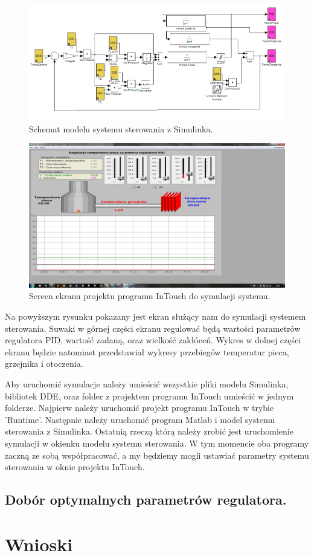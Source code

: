 \documentclass[a4paper,10pt]{article}
\begin{document}
\begin{figure}[!h]
    \centering
	\includegraphics[width=120mm]{CW6-model.png}
	\caption{Schemat modelu systemu sterowania z Simulinka.}
    \label{fig:Rysunek}
\end{figure}
\begin{figure}[!h]
    \centering
	\includegraphics[width=120mm]{CW6-start.png}
	\caption{Screen ekranu projektu programu InTouch do symulacji systemu.}
    \label{fig:Rysunek}
\end{figure}
Na powyższym rysunku pokazany jest ekran służący nam do symulacji systemem sterowania. Suwaki w górnej części ekranu regulować będą wartości parametrów regulatora PID, wartość zadaną, oraz wielkość zakłóceń. Wykres w dolnej części ekranu będzie natomiast przedstawiał wykresy przebiegów temperatur pieca, grzejnika i otoczenia.

Aby uruchomić symulacje należy umieścić wszystkie pliki modelu Simulinka, bibliotek DDE, oraz folder z projektem programu InTouch umieścić w jednym folderze. Najpierw należy uruchomić projekt programu InTouch w trybie 'Runtime'. Następnie należy uruchomić program Matlab i model systemu sterowania z Simulinka. Ostatnią rzeczą którą należy zrobić jest uruchomienie symulacji w okienku modelu systemu sterowania. W tym momencie oba programy zaczną ze sobą współpracować, a my będziemy mogli ustawiać parametry systemu sterowania w oknie projektu InTouch.

\subsection{Dobór optymalnych parametrów regulatora.}\label{sec:zad2}

\section{Wnioski}
\end{document}
